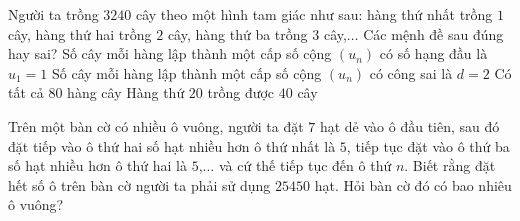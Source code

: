 \begin{ex}%
	Người ta trồng $3240$ cây theo một hình tam giác như sau: hàng thứ nhất trồng $1$ cây, hàng thứ hai trồng $2$ cây, hàng thứ ba trồng $3$ cây,$\ldots$ Các mệnh đề sau đúng hay sai?
	\choiceTF
	{\True Số cây mỗi hàng lập thành một cấp số cộng $(u_n)$ có số hạng đầu là $u_1=1$}
	{Số cây mỗi hàng lập thành một cấp số cộng $(u_n)$ có công sai là $d=2$}
	{\True Có tất cả $80$ hàng cây}
	{Hàng thứ $20$ trồng được $40$ cây}
\end{ex}

\begin{bt}%
	Trên một bàn cờ có nhiều ô vuông, người ta đặt $7$ hạt dẻ vào ô đầu tiên, sau đó đặt tiếp vào ô thứ hai số hạt nhiều hơn ô thứ nhất là $5$, tiếp tục đặt vào ô thứ ba số hạt nhiều hơn ô thứ hai là $5$,$\ldots$ và cứ thế tiếp tục đến ô thứ $n$. Biết rằng đặt hết số ô trên bàn cờ người ta phải sử dụng $25450$ hạt. Hỏi bàn cờ đó có bao nhiêu ô vuông?\par
\end{bt}

